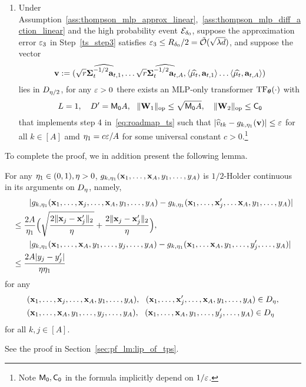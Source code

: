 \begin{enumerate}[label=Step \arabic*,ref= \arabic*]
  \item\label{ts_step4} Under  Assumption~\ref{ass:thompson_mlp_approx_linear},~\ref{ass:thompson_mlp_diff_action_linear} and the high probability event ${\mathcal E}_{\delta_0}$, suppose the approximation error $\varepsilon_3$ in Step~\ref{ts_step3} satisfies $\varepsilon_3\leq R_{\delta_0}/2={\tilde{\mathcal O}}(\sqrt{\lambda d})$, and  suppose the vector $${\mathbf{v}}:=(\sqrt{{r}}\widehat{{{\mathbf\Sigma}}_t^{-1/2}{\mathbf a}_{t,1}},\ldots
        \sqrt{{r}}\widehat{{{\mathbf\Sigma}}_t^{-1/2}{\mathbf a}_{t,A}},
        \left\langle\widehat{{{\mathbf\mu}}_t},{\mathbf a}_{t,1}\right\rangle\ldots
        \left\langle\widehat{{{\mathbf\mu}}_t},{\mathbf a}_{t,A}\right\rangle)$$ lies in ${D}_{{\eta}/2}$, for any $\varepsilon>0$ there exists an MLP-only transformer ${\rm TF}_{\boldsymbol \theta}(\cdot)$ with
    $$
    L=1,~~~D'= {\mathsf{M_0}} A,~~\|{{\mathbf W}_1}\|_{\mathrm{op}}\leq \sqrt{{\mathsf{M_0}} A}, ~~~\|{{\mathbf W}_2}\|_{\mathrm{op}}\leq {{\mathsf{C_0}}}$$
  that implements step 4 in~\eqref{eq:roadmap_ts} such that $|\widehat v_{tk}-g_{k,{\eta_1}}({\mathbf{v}})|\leq \varepsilon$ for all $k\in[A]$ amd ${\eta_1}=c\varepsilon/A$ for some universal constant $c>0$.\footnote{Note ${\mathsf{M_0}},{{\mathsf{C_0}}}$ in the formula implicitly depend on $1/\varepsilon$.}

\end{enumerate}

To complete the proof, we in addition present the following lemma.
\begin{lemma}\label{lm:lip_of_tps}
For any ${\eta_1}\in(0,1),{\eta}>0$, $g_{k,{\eta_1}}({\mathbf x}_1,\ldots,{\mathbf x}_A,y_1,\ldots,y_A)$ is $1/2$-Holder continuous in its arguments on ${D}_{\eta}$, namely,
    \begin{align*}
        &\qquad|g_{k,{\eta_1}}({\mathbf x}_1,\ldots,{\mathbf x}_j,\ldots,{\mathbf x}_A,y_1,\ldots,y_A)-g_{k,{\eta_1}}({\mathbf x}_1,\ldots,{\mathbf x}'_j,\ldots{\mathbf x}_A,y_1,\ldots,y_A)|
        \\
        &
        \leq \frac{2A}{{\eta_1}}\Big(\sqrt{\frac{2\|{\mathbf x}_j-{\mathbf x}_j'\|_2}{{\eta}}}+\frac{2\|{\mathbf x}_j-{\mathbf x}_j'\|_2}{{\eta}}\Big),
        \\
           &\qquad |g_{k,{\eta_1}}({\mathbf x}_1,\ldots,{\mathbf x}_A,y_1,\ldots,y_j,\ldots,y_A)-g_{k,{\eta_1}}({\mathbf x}_1,\ldots{\mathbf x}_A,y_1,\ldots,y_j',\ldots,y_A)|
           \\
        &\leq 
       \frac{2A|y_j-y_j'|}{{\eta}{\eta_1}}
    \end{align*}
    for any \begin{align*}&(\bx_1,\ldots,\bx_j,\ldots,\bx_A,y_1,\ldots,y_A),~~(\bx_1,\ldots,\bx_j',\ldots,\bx_A,y_1,\ldots,y_A)\in\Trunreg_\Trunregp ,\\&(\bx_1,\ldots,\bx_A,y_1,\ldots,y_j,\ldots,y_A),~~(\bx_1,\ldots,\bx_A,y_1,\ldots,y_j',\ldots,y_A)\in\Trunreg_\Trunregp
    \end{align*} 
  for all $k,j\in[A]$. 
\end{lemma}
See the proof in Section~\ref{sec:pf_lm:lip_of_tps}. 

